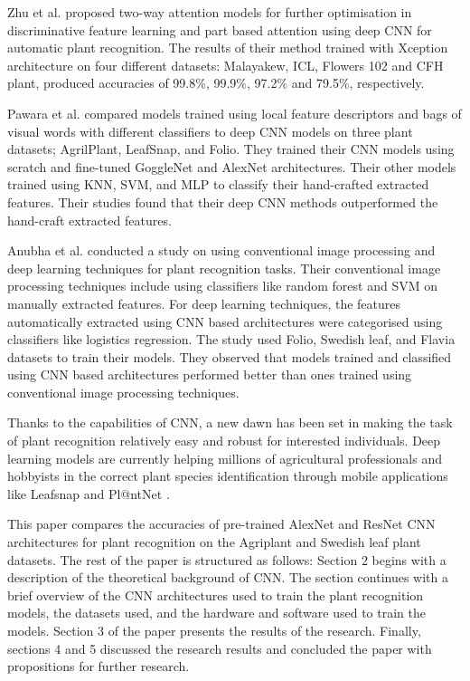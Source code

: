 \documentclass[conference]{IEEEtran}
\begin{document}
Zhu et al. \cite{zhu2019ta} proposed two-way attention models for further optimisation in discriminative feature learning and part based attention using deep CNN for automatic plant recognition. The results of their method trained with Xception architecture on four different datasets: Malayakew, ICL, Flowers 102 and CFH plant, produced accuracies of 99.8\%, 99.9\%, 97.2\% and 79.5\%, respectively.

Pawara et al. \cite{pawara2017comparing} compared models trained using local feature descriptors and bags of visual words with different classifiers to deep CNN models on three plant datasets; AgrilPlant, LeafSnap, and Folio. They trained their CNN models using scratch and fine-tuned GoggleNet and AlexNet architectures. Their other models trained using KNN, SVM, and MLP to classify their hand-crafted extracted features. Their studies found that their deep CNN methods outperformed the hand-craft extracted features.

Anubha et al. \cite{anubha2019study} conducted a study on using conventional image processing and deep learning techniques for plant recognition tasks. Their conventional image processing techniques include using classifiers like random forest and SVM on manually extracted features. For deep learning techniques, the features automatically extracted using CNN based architectures were categorised using classifiers like logistics regression. The study used Folio, Swedish leaf, and Flavia datasets to train their models. They observed that models trained and classified using CNN based architectures performed better than ones trained using conventional image processing techniques.

Thanks to the capabilities of CNN, a new dawn has been set in making the task of plant recognition relatively easy and robust for interested individuals. Deep learning models are currently helping millions of agricultural professionals and hobbyists in the correct plant species identification through mobile applications like Leafsnap and Pl@ntNet \cite{kumar2012leafsnap, plantnet_team}.

This paper compares the accuracies of pre-trained AlexNet and ResNet CNN architectures for plant recognition on the Agriplant and Swedish leaf plant datasets. The rest of the paper is structured as follows: Section 2 begins with a description of the theoretical background of CNN. The section continues with a brief overview of the CNN architectures used to train the plant recognition models, the datasets used, and the hardware and software used to train the models. Section 3 of the paper presents the results of the research. Finally, sections 4 and 5 discussed the research results and concluded the paper with propositions for further research.
\end{document}
